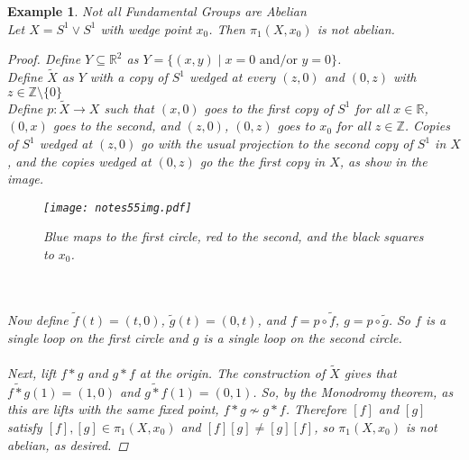 \documentclass[11pt]{article}
\newtheorem{example}[theorem]{Example}
\newcommand{\R}[0]{\mathbb{R}}
\newcommand{\Z}[0]{\mathbb{Z}}
\begin{document}
\begin{example} Not all Fundamental Groups are Abelian
\\
Let $X = S^1 \vee S^1$ with wedge point $x_0$.  Then $\pi_1(X, x_0)$ is not abelian.
\begin{proof}
Define $Y \subseteq \R^2$ as $Y = \{ (x,y) \mid x = 0 \text{ and/or } y = 0\}$.
\\
Define $\widetilde{X}$ as $Y$ with a copy of $S^1$ wedged at every $(z,0)$ and $(0,z)$ with $z \in \Z \setminus \{0\}$
\\
\newpage
\noindent Define $p : \widetilde{X} \to X$ such that $(x,0)$ goes to the first copy of $S^1$ for all $x \in \R$, $(0,x)$ goes to the second, and $(z,0)$, $(0,z)$ goes to $x_0$ for all $z \in \Z$.  Copies of $S^1$ wedged at $(z,0)$ go with the usual projection to the second copy of $S^1$ in $X$, and the copies wedged at $(0,z)$ go the the first copy in $X$, as show in the image.
\begin{figure}[htdp]
\begin{center}
\texttt{[image: notes55img.pdf]}
\caption{Blue maps to the first circle, red to the second, and the black squares to $x_0$.}
\end{center}
\end{figure}
\\
\\
Now define $\widetilde{f}(t) = (t,0)$, $\widetilde{g}(t) = (0,t)$, and $f = p \circ \widetilde{f}$, $g = p \circ \widetilde{g}$.  So $f$ is a single loop on the first circle and $g$ is a single loop on the second circle.
\\
\\
Next, lift $f * g$ and $g * f$ at the origin.  The construction of $\widetilde{X}$ gives that $\widetilde{f * g}(1) = (1,0)$ and $\widetilde{g * f}(1) = (0,1)$.  So, by the Monodromy theorem, as this are lifts with the same fixed point, $f * g \not \sim g * f$.  Therefore $[f]$ and $[g]$ satisfy $[f],[g] \in \pi_1(X,x_0)$ and $[f][g] \neq [g][f]$, so $\pi_1(X,x_0)$ is not abelian, as desired.

\end{proof}
\end{example}
\end{document}

